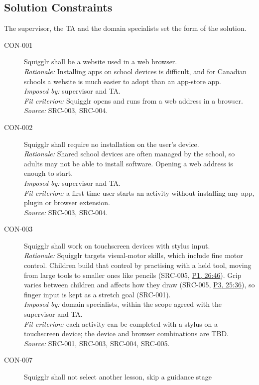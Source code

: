 \documentclass[12pt]{article}
\renewcommand{\_}{\textunderscore\allowbreak}%
\newcommand{\intlink}[3]{\hyperref[int:#1-#2]{#3}}
\newcommand{\intref}[2]{\intlink{#1}{#2}{#1, #2}}
\begin{document}
\subsection{Solution Constraints}
The supervisor, the TA and the domain specialists set the form of the solution.

\begin{description}
\item[CON-001] Squigglr shall be a website used in a web browser.\\
\emph{Rationale:} Installing apps on school devices is difficult, and for
Canadian schools a website is much easier to adopt than an app-store app.\\
\emph{Imposed by:} supervisor and TA.\\
\emph{Fit criterion:} Squigglr opens and runs from a web address in a browser.\\
\emph{Source:} SRC-003, SRC-004.
\item[CON-002] Squigglr shall require no installation on the user's device.\\
\emph{Rationale:} Shared school devices are often managed by the school, so
adults may not be able to install software. Opening a web address is enough to
start.\\
\emph{Imposed by:} supervisor and TA.\\
\emph{Fit criterion:} a first-time user starts an activity without installing
any app, plugin or browser extension.\\
\emph{Source:} SRC-003, SRC-004.
\item[CON-003] Squigglr shall work on touchscreen devices with stylus input.\\
\emph{Rationale:} Squigglr targets visual-motor skills, which include fine motor
control. Children build that control by practising with a held tool, moving from
large tools to smaller ones like pencils (SRC-005, \intref{P1}{26:46}). Grip
varies between children and affects how they draw (SRC-005, \intref{P3}{25:36}),
so finger input is kept as a stretch goal (SRC-001).\\
\emph{Imposed by:} domain specialists, within the scope agreed with the
supervisor and TA.\\
\emph{Fit criterion:} each activity can be completed with a stylus on a
touchscreen device; the device and browser combinations are TBD.\\
\emph{Source:} SRC-001, SRC-003, SRC-004, SRC-005.
\item[CON-007] Squigglr shall not select another lesson, skip a guidance stage

\end{description}
\end{document}
